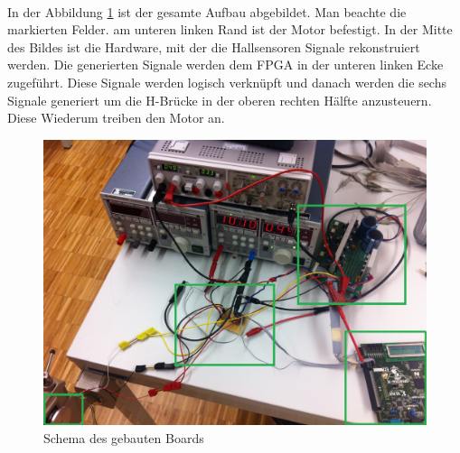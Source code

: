 \\
In der Abbildung \ref{abb:MessplatzAufbau} ist der gesamte Aufbau abgebildet. Man beachte die markierten Felder. am unteren linken Rand ist der Motor befestigt. In der Mitte des Bildes ist die Hardware, mit der die Hallsensoren Signale rekonstruiert werden. Die generierten Signale werden dem FPGA in der unteren linken Ecke zugeführt. Diese Signale werden logisch verknüpft und danach werden die sechs Signale generiert um die H-Brücke in der oberen rechten Hälfte anzusteuern. Diese Wiederum treiben den Motor an.\\
\begin{figure}[h!]
	\includegraphics[scale=0.14]{Funktionstests/Bilder/MessplatzAufbau.jpg}
	\centering
	\caption{Schema des gebauten Boards} 
\label{abb:MessplatzAufbau}
\end{figure}